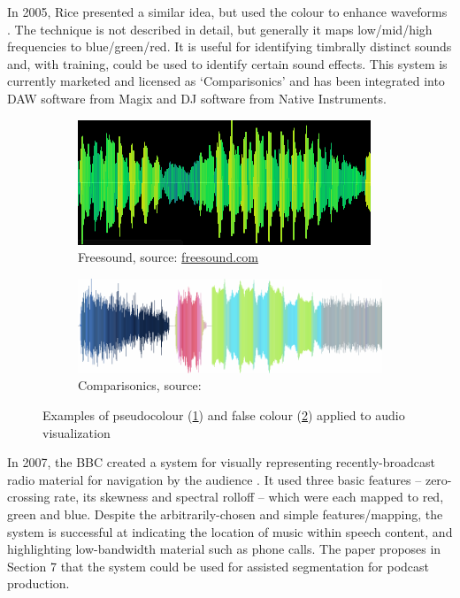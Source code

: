 In 2005, Rice presented a similar idea, but used the colour to enhance
waveforms \cite{Rice2005}. The technique is not described in detail, but
generally it maps low/mid/high frequencies to blue/green/red. It is useful for
identifying timbrally distinct sounds and, with training, could be used to
identify certain sound effects. This system is currently marketed and licensed
as `Comparisonics' and has been integrated into DAW software from Magix and DJ
software from Native Instruments.

\begin{figure}[ht]
\centering
\begin{subfigure}{.5\textwidth}
  \centering
  \includegraphics[width=\linewidth]{figs/freesound.png}
  \caption{Freesound, source: \url{freesound.com}}
  \label{fig:freesound}
\end{subfigure}%
\begin{subfigure}{.5\textwidth}
  \centering
  \includegraphics[width=\linewidth]{figs/rice.png}
  \caption{Comparisonics, source: \cite{Rice2005}}
  \label{fig:rice}
\end{subfigure}
\caption{Examples of pseudocolour (\ref{fig:freesound}) and false colour
  (\ref{fig:rice}) applied to audio visualization}
\label{fig:colourvis}
\end{figure}

In 2007, the BBC created a system for visually representing recently-broadcast
radio material for navigation by the audience \cite{Mason2007}. It used three
basic features -- zero-crossing rate, its skewness and spectral rolloff --
which were each mapped to red, green and blue. Despite the arbitrarily-chosen
and simple features/mapping, the system is successful at indicating the
location of music within speech content, and highlighting low-bandwidth
material such as phone calls. The paper proposes in Section 7 that the system
could be used for assisted segmentation for podcast production.

